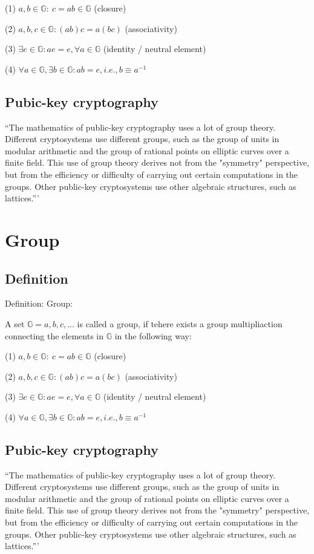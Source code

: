 \documentclass[twocolumn]{article}
\begin{document}
(1) $a, b \in \mathbb{G}:\ c=a b \in \mathbb{G}$ (closure)

(2) $a, b, c \in \mathbb{G}: (ab)c=a(bc)$ (associativity)

(3) $\exists e \in \mathbb{G}: ae=e, \forall a \in \mathbb{G}$ (identity / neutral element)

(4) $\forall a \in \mathbb{G}, \exists b \in \mathbb{G}: ab=e, i.e., b\equiv a^{-1}$

\subsection{Pubic-key cryptography}
``The mathematics of public-key cryptography uses a lot of group theory. Different cryptosystems use different groups, such as the group of units in modular arithmetic and the group of rational points on elliptic curves over a finite field. This use of group theory derives not from the "symmetry" perspective, but from the efficiency or difficulty of carrying out certain computations in the groups. Other public-key cryptosystems use other algebraic structures, such as lattices.''' \cite{Cardelli:1996:TS:234313.234418}
\section{Group}
\subsection{Definition}
Definition: Group\cite{Cardelli:1996:TS:234313.234418}:

A set $\mathbb{G}={a, b, c, ...}$ is called a group, if tehere exists a group multipliaction connecting the elements in $\mathbb{G}$ in the following way:

(1) $a, b \in \mathbb{G}:\ c=a b \in \mathbb{G}$ (closure)

(2) $a, b, c \in \mathbb{G}: (ab)c=a(bc)$ (associativity)

(3) $\exists e \in \mathbb{G}: ae=e, \forall a \in \mathbb{G}$ (identity / neutral element)

(4) $\forall a \in \mathbb{G}, \exists b \in \mathbb{G}: ab=e, i.e., b\equiv a^{-1}$

\subsection{Pubic-key cryptography}
``The mathematics of public-key cryptography uses a lot of group theory. Different cryptosystems use different groups, such as the group of units in modular arithmetic and the group of rational points on elliptic curves over a finite field. This use of group theory derives not from the "symmetry" perspective, but from the efficiency or difficulty of carrying out certain computations in the groups. Other public-key cryptosystems use other algebraic structures, such as lattices.''' \cite{Cardelli:1996:TS:234313.234418}
\end{document}

